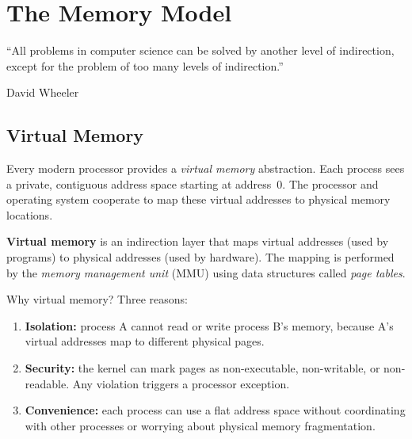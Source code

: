 \chapter{The Memory Model}
\label{ch:memory-model}

\epigraph{``All problems in computer science can be solved by another level of indirection, except for the problem of too many levels of indirection.''}{David Wheeler}


\section{Virtual Memory}

Every modern processor provides a \emph{virtual memory} abstraction. Each process sees a private, contiguous address space starting at address~0. The processor and operating system cooperate to map these virtual addresses to physical memory locations.

\begin{definition}
	\textbf{Virtual memory} is an indirection layer that maps virtual addresses (used by programs) to physical addresses (used by hardware). The mapping is performed by the \emph{memory management unit} (MMU) using data structures called \emph{page tables}.
\end{definition}

Why virtual memory? Three reasons:

\begin{enumerate}
	\item \textbf{Isolation:} process A cannot read or write process B's memory, because A's virtual addresses map to different physical pages.
	\item \textbf{Security:} the kernel can mark pages as non-executable, non-writable, or non-readable. Any violation triggers a processor exception.
	\item \textbf{Convenience:} each process can use a flat address space without coordinating with other processes or worrying about physical memory fragmentation.
\end{enumerate}

